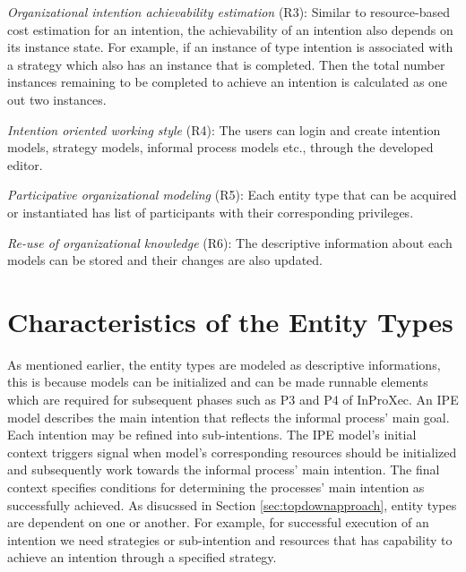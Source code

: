 \textit{Organizational intention achievability estimation} (R3): Similar to resource-based cost estimation for an intention, the achievability of an intention also depends on its instance state. For example, if an instance of type intention is associated with a strategy which also has an instance that is completed. Then the total number instances remaining to be completed to achieve an intention is calculated as one out two instances. 

\textit{Intention oriented working style} (R4): The users can login and create intention models, strategy models, informal process models etc., through the developed editor. 

\textit{Participative organizational modeling} (R5): Each entity type that can be acquired or instantiated has list of participants with their corresponding privileges. 

\textit{Re-use of organizational knowledge} (R6): The descriptive information about each models can be stored and their changes are also updated. 
 
\section{Characteristics of the Entity Types}
\label{sec:enttyperelation}
As mentioned earlier, the entity types are modeled as descriptive informations, this is because models can be initialized and can be made runnable elements which are required for subsequent phases such as P3 and P4 of InProXec. An IPE model describes the main intention that reflects the informal process' main goal. Each intention may be refined into sub-intentions. The IPE model's initial context triggers signal when model's corresponding resources should be initialized and subsequently work towards the informal process' main intention\cite{Sungur2015a}. The final context specifies conditions for determining the processes' main intention as successfully achieved. As disucssed in Section \ref{sec:topdownapproach}, entity types are dependent on one or another. For example, for successful execution of an intention we need strategies or sub-intention and resources that has capability to achieve an intention through a specified strategy. 

